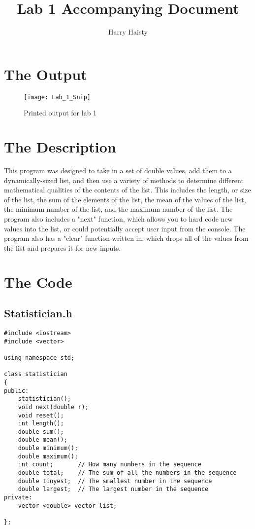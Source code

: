 \documentclass[11pt]{article}
\title{Lab 1 Accompanying Document}
\author{Harry Haisty}
\begin{document}
\maketitle

\section*{The Output}
\begin{figure}[H]
\centering

\texttt{[image: Lab\_1\_Snip]}
\caption{Printed output for lab 1}
\end{figure}

\section*{The Description}
This program was designed to take in a set of double values, add them to a dynamically-sized list, and then use a variety of methods to determine different mathematical qualities of the contents of the list. This includes the length, or size of the list, the sum of the elements of the list, the mean of the values of the list, the minimum number of the list, and the maximum number of the list. 
\newline
The program also includes a "next" function, which allows you to hard code new values into the list, or could potentially accept user input from the console. The program also has a "clear" function written in, which drops all of the values from the list and prepares it for new inputs. 

\newpage
\section*{The Code}

\subsection*{Statistician.h}
\begin{lstlisting}
#include <iostream>
#include <vector>

using namespace std; 

class statistician
{
public:
	statistician();
	void next(double r);
	void reset();
	int length();
	double sum();
	double mean();
	double minimum();
	double maximum();
	int count;       // How many numbers in the sequence
	double total;    // The sum of all the numbers in the sequence
	double tinyest;  // The smallest number in the sequence
	double largest;  // The largest number in the sequence
private: 
	vector <double> vector_list;
	
};

\end{lstlisting}
\end{document}
